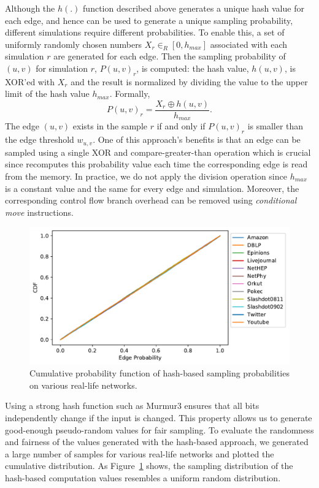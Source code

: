 \documentclass[review]{elsarticle}
\newcommand\acro{{\sc{HyperFuseR\xspace}\xspace}\xspace}
\begin{document}
Although the $h(.)$ function described above generates a unique hash value for each edge, and hence can be used to generate a unique sampling probability, different simulations require different probabilities. To enable this, a set of uniformly randomly chosen numbers $X_r \in_R [0, h_{max}]$ associated with each simulation $r$ are generated for each edge. Then the sampling probability of $(u, v)$ for simulation $r$, $P(u, v)_r$, is computed: the hash value, $h(u,v)$, is XOR'ed with  $X_r$ and the result is normalized by dividing the value to the upper limit of the hash value $h_{max}$. Formally,
\begin{equation}
    \label{eq:hash_prob}
    P(u,v)_r = \frac{X_r \oplus h(u,v)}{h_{max}}.
\end{equation}
The edge $(u,v)$ exists in the sample $r$ if and only if  ${P}(u,v)_r$ is smaller than the edge threshold $w_{u,v}$. One of this approach's benefits is that an edge can be sampled using a single XOR and compare-greater-than operation which is crucial since \acro{} recomputes this probability value each time the corresponding edge is read from the memory. In practice, we do not apply the division operation since $h_{max}$ is a constant value and the same for every edge and simulation. Moreover, the corresponding control flow branch overhead can be removed using {\em conditional move} instructions. 

\begin{figure}[!ht] 
    \centering
    \includegraphics[width=0.8\linewidth]{./images/CDF.pdf}
    \caption{\small{Cumulative probability function of hash-based sampling probabilities on various real-life networks.}}
    \label{fig:prob-cdf} 
\end{figure}

Using a strong hash function such as {{\sc Murmur3}} ensures that all bits independently change if the input is changed. This property allows us to generate good-enough pseudo-random values for fair sampling. To evaluate the randomness and fairness of the values generated with the hash-based approach, we generated a large number of samples for various real-life networks and plotted the cumulative distribution.
As Figure~\ref{fig:prob-cdf} shows, the sampling distribution of the hash-based computation values resembles a uniform random distribution. 
\end{document}
